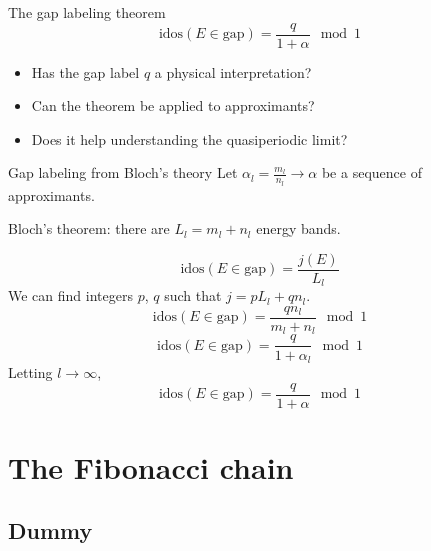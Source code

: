 \documentclass[xcolor=x11names,compress,professionalfonts]{beamer}
\renewcommand{\(}{\begin{columns}}
\renewcommand{\)}{\end{columns}}
\newcommand{\<}[1]{\begin{column}{#1}}
\renewcommand{\>}{\end{column}}
\newcommand{\id}{\ensuremath{\text{idos}}}
\begin{document}
\begin{frame}{The gap labeling theorem}
\[
		\id(E \in \text{gap}) = \frac{q}{1+\alpha} \mod 1
\]
\begin{itemize}
	\item Has the gap label $q$ a physical interpretation?
	\item Can the theorem be applied to approximants? 
	\item Does it help understanding the quasiperiodic limit?
\end{itemize}

\end{frame}

\begin{frame}{Gap labeling from Bloch's theory}
Let $\alpha_l = \frac{m_l}{n_l} \to \alpha$ be a sequence of approximants.

Bloch's theorem: there are $L_l = m_l + n_l$ energy bands.

\[
	\id(E \in \text{gap}) = \frac{j(E)}{L_l}
\]
We can find integers $p$, $q$ such that $j = p L_l + q n_l$.
\[
	\id(E \in \text{gap}) = \frac{q n_l}{m_l + n_l} \mod 1
\]
\[
	\id(E \in \text{gap}) = \frac{q }{1+\alpha_l} \mod 1
\]
Letting $l \to \infty$,
	\[
		\id(E \in \text{gap}) = \frac{q}{1+\alpha} \mod 1
	\]

    

\end{frame}

\section{The Fibonacci chain}
\subsection{Dummy}
\end{document}
